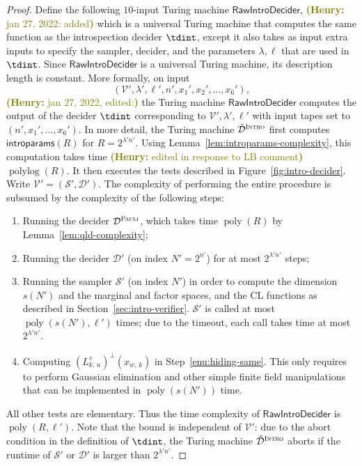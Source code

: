 \documentclass[11pt]{article}
\theoremstyle{definition}
\DeclareMathOperator{\poly}{poly}
\DeclareMathOperator{\polylog}{polylog}
\newcommand{\sampler}{\mathcal{S}}
\newcommand{\decider}{\mathcal{D}}
\newcommand{\verifier}{\mathcal{V}}
\newcommand{\gamestyle}[1]{\ensuremath{\textsc{#1}}\xspace}
\newcommand{\pauli}{\gamestyle{Pauli}}
\newcommand{\intro}{\gamestyle{Intro}}
\newcommand{\trole}{\ensuremath{v}}
\renewcommand{\cal}[1]{\mathcal{#1}}
\newcommand{\introparams}{\mathsf{introparams}}
\newcommand{\tmstyle}[1]{\ensuremath{\mathsf{#1}}}
\newcommand{\RawIntroDecider}{\tmstyle{RawIntroDecider}}
\newcommand{\hnote}[1]{\textcolor{olive}{\small {\textbf{(Henry:} #1\textbf{) }}}}
\newcommand{\hnote}[1]{}
\begin{document}
\begin{proof}
  Define the following $10$-input Turing machine $\RawIntroDecider$, \hnote{jan 27, 2022: added} which is 
  a universal Turing machine that computes the same function as the introspection decider $\tdint$, except
  it also takes as input extra inputs to specify the sampler, decider, and the parameters $\lambda, \ell$ that are 
  used in $\tdint$. Since $\RawIntroDecider$ is a universal Turing machine, its description length is constant.
  More formally, on input
  \begin{equation*}
    (\verifier', \lambda', \ell', n', x_1', x_2', \ldots, x_6'),
  \end{equation*}
    \hnote{jan 27, 2022, edited:} the Turing machine $\RawIntroDecider$ computes the output of the decider $\tdint$
    corresponding to $\verifier', \lambda', \ell'$ with input tapes set to $(n',x_1',\ldots,x_6')$.
In more detail, the Turing machine $\hat{\cal{D}}^{\intro}$ first computes
  $\introparams(R)$ for $R=2^{\lambda' n'}$. 
  Using Lemma~\ref{lem:introparams-complexity}, this computation takes time
  \hnote{edited in response to LB comment} $\polylog(R)$.
  It then executes the tests described in Figure~\ref{fig:intro-decider}.
  Write $\verifier' = (\sampler', \decider')$.
  The complexity of performing the entire procedure is subsumed by the
  complexity of the following steps:
	\begin{enumerate}
  \item Running the decider $\decider^\pauli$, which takes time $\poly(R)$ by
    Lemma~\ref{lem:qld-complexity};
  \item Running the decider $\decider'$ (on index $N' = 2^{n'}$) for at most
    $2^{\lambda' n'}$ steps;
  \item Running the sampler $\sampler'$ (on index $N'$) in order to
    compute the dimension $s(N')$ and the marginal and factor spaces, and the CL
    functions as described in Section~\ref{sec:intro-verifier}.
    $\sampler'$ is called at most $\poly(s(N'),\ell')$ times; due to the timeout,
    each call takes time at most $2^{\lambda' n'}$.
  \item Computing $(L^\trole_{k,\, u})^\perp(x_{\overline{w},\, k})$ in
    Step~\ref{enu:hiding-same}.
    This only requires to perform Gaussian elimination and other simple finite
    field manipulations that can be implemented in $\poly(s(N'))$
    time.
	\end{enumerate}
  All other tests are elementary.
  Thus the time complexity of $\RawIntroDecider$ is $\poly(R,\ell')$.
  Note that the bound is independent of $\verifier'$: due to the abort
  condition in the definition of $\tdint$, the Turing machine
  $\hat{\decider}^\intro$ aborts if the runtime of $\sampler'$ or $\decider'$ is
  larger than $2^{\lambda' n'}$. 


\end{proof}
\end{document}
